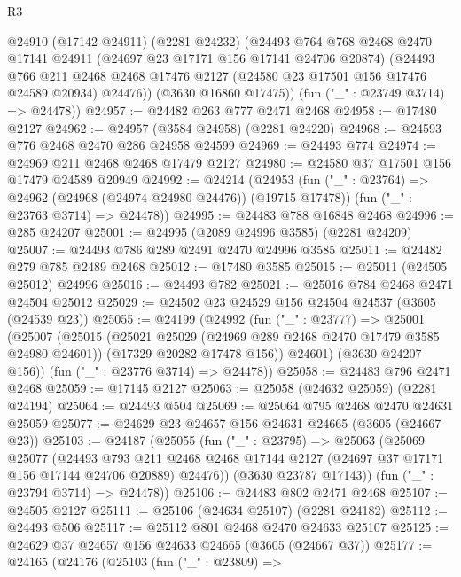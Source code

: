 \begin{lexlean}{R3}
\begin{coremodule}
      @24910
        (@17142 @24911)
        (@2281 @24232)
        (@24493
          @764
          @768
          @2468
          @2470
          @17141
          @24911
          (@24697 @23 @17171 @156 @17141 @24706 @20874)
          (@24493
            @766
            @211
            @2468
            @2468
            @17476
            @2127
            (@24580 @23 @17501 @156 @17476 @24589 @20934)
            @24476))
        (@3630 @16860 @17475))
      (fun ("_" : @23749 @3714) => @24478))
@24957 := @24482 @263 @777 @2471 @2468
@24958 := @17480 @2127
@24962 := @24957 (@3584 @24958) (@2281 @24220)
@24968 := @24593 @776 @2468 @2470 @286 @24958 @24599
@24969 := @24493 @774
@24974 := @24969 @211 @2468 @2468 @17479 @2127
@24980 := @24580 @37 @17501 @156 @17479 @24589 @20949
@24992 := @24214
    (@24953
      (fun ("_" : @23764) => @24962 (@24968 (@24974 @24980 @24476)) (@19715 @17478))
      (fun ("_" : @23763 @3714) => @24478))
@24995 := @24483 @788 @16848 @2468
@24996 := @285 @24207
@25001 := @24995 (@2089 @24996 @3585) (@2281 @24209)
@25007 := @24493 @786 @289 @2491 @2470 @24996 @3585
@25011 := @24482 @279 @785 @2489 @2468
@25012 := @17480 @3585
@25015 := @25011 (@24505 @25012) @24996
@25016 := @24493 @782
@25021 := @25016 @784 @2468 @2471 @24504 @25012
@25029 := @24502 @23 @24529 @156 @24504 @24537 (@3605 (@24539 @23))
@25055 := @24199
    (@24992
      (fun ("_" : @23777) =>
      @25001
        (@25007
          (@25015
            (@25021 @25029 (@24969 @289 @2468 @2470 @17479 @3585 @24980 @24601))
            (@17329 @20282 @17478 @156))
          @24601)
        (@3630 @24207 @156))
      (fun ("_" : @23776 @3714) => @24478))
@25058 := @24483 @796 @2471 @2468
@25059 := @17145 @2127
@25063 := @25058 (@24632 @25059) (@2281 @24194)
@25064 := @24493 @504
@25069 := @25064 @795 @2468 @2470 @24631 @25059
@25077 := @24629 @23 @24657 @156 @24631 @24665 (@3605 (@24667 @23))
@25103 := @24187
    (@25055
      (fun ("_" : @23795) =>
      @25063
        (@25069
          @25077
          (@24493
            @793
            @211
            @2468
            @2468
            @17144
            @2127
            (@24697 @37 @17171 @156 @17144 @24706 @20889)
            @24476))
        (@3630 @23787 @17143))
      (fun ("_" : @23794 @3714) => @24478))
@25106 := @24483 @802 @2471 @2468
@25107 := @24505 @2127
@25111 := @25106 (@24634 @25107) (@2281 @24182)
@25112 := @24493 @506
@25117 := @25112 @801 @2468 @2470 @24633 @25107
@25125 := @24629 @37 @24657 @156 @24633 @24665 (@3605 (@24667 @37))
@25177 := @24165
    (@24176
      (@25103
        (fun ("_" : @23809) =>

\end{coremodule}
\end{lexlean}
